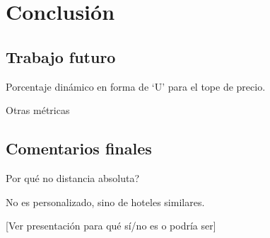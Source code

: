 \documentclass[12pt]{report}
\begin{document}
\chapter{Conclusión}
\section{Trabajo futuro}
Porcentaje dinámico en forma de `U' para el tope de precio.

Otras métricas
\section{Comentarios finales}
Por qué no distancia absoluta?

No es personalizado, sino de hoteles similares.

[Ver presentación para qué sí/no es o podría ser]
\end{document}

